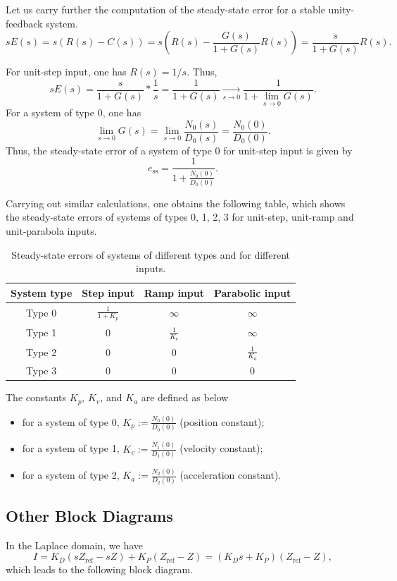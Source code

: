 \documentclass[a4paper,11pt]{report}
\newcommand{\sse}{\mathrm{ss}}
\newcommand{\re}{\mathrm{ref}}
\begin{document}
Let us carry further the computation of the steady-state error for a
stable unity-feedback system.
\[
sE(s) = s(R(s)-C(s)) = s\left(R(s)-\frac{G(s)}{1+G(s)}R(s)\right)=\frac{s}{1+G(s)}R(s).
\]

For unit-step input, one has $R(s)=1/s$. Thus,
\[
sE(s) = \frac{s}{1+G(s)}*\frac{1}{s} = \frac{1}{1+G(s)}
\xrightarrow[s\to 0]{}\frac{1}{1+\lim_{s\to 0}G(s)}.
\]
For a system of type 0, one has
\[
\lim_{s\to 0}G(s) = \lim_{s\to 0}\frac{N_0(s)}{D_0(s)} = \frac{N_0(0)}{D_0(0)}.
\]
Thus, the steady-state error of a system of type 0 for unit-step input
is given by
\[
e_\sse = \frac{1}{1+\frac{N_0(0)}{D_0(0)}}.
\]

Carrying out similar calculations, one obtains the following table,
which shows the steady-state errors of systems of types 0, 1, 2, 3 for
unit-step, unit-ramp and unit-parabola inputs.

\begin{table}[htp]
	\centering
	\begin{tabular}{|c|c|c|c|}
		\hline
		System type&Step input&Ramp input&Parabolic input\\\hline
		Type 0&$\frac{1}{1+K_p}$&$\infty$&$\infty$\\\hline
		Type 1&0&$\frac{1}{K_v}$&$\infty$\\\hline
		Type 2&0&0&$\frac{1}{K_a}$\\\hline
		Type 3&0&0&0\\\hline
	\end{tabular}
	\caption{Steady-state errors of systems of different types and for
		different inputs.}
	\label{tab:systype}
\end{table}

The constants $K_p$, $K_v$, and $K_a$ are defined as below
\begin{itemize}
	\item for a system of type 0, $K_p:=\frac{N_0(0)}{D_0(0)}$ (position constant);
	\item for a system of type 1, $K_v:=\frac{N_1(0)}{D_1(0)}$ (velocity constant);
	\item for a system of type 2, $K_a:=\frac{N_2(0)}{D_2(0)}$
	(acceleration constant).
\end{itemize}

\subsection{Other Block Diagrams}
In the Laplace domain, we have
\[
I = K_D(sZ_\re-sZ) + K_P(Z_\re-Z) = (K_Ds+K_P)(Z_\re-Z),
\]
which leads to the following block diagram.
\end{document}
